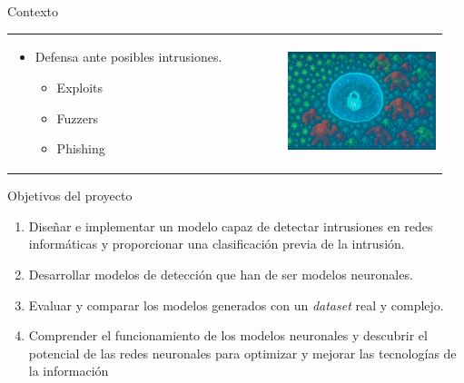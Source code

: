 \begin{frame}{Contexto}
\begin{tabular}{ >{\raggedright\arraybackslash}m{0.6\linewidth} >{\centering\arraybackslash}m{0.35\linewidth} }
    \begin{itemize}
      \item Defensa ante posibles intrusiones.
      \begin{itemize}
      	\item Exploits
      	\item Fuzzers
      	\item Phishing
      \end{itemize}
    \end{itemize} &
    \includegraphics[width=\linewidth]{./img/atacados.png} \\
  \end{tabular}
\end{frame}


\begin{frame}{Objetivos del proyecto}
    \begin{enumerate}
        \item  Diseñar e implementar un modelo capaz de detectar intrusiones en redes informáticas y proporcionar una clasificación previa de la intrusión.
        \vspace{10mm}
        \item Desarrollar modelos de detección que han de ser modelos neuronales.
        \vspace{10mm}
        \item Evaluar y comparar los modelos generados con un \textit{dataset} real y complejo.
        \vspace{10mm}
        \color{DoS}
        \item Comprender el funcionamiento de los modelos neuronales y descubrir el potencial de las redes neuronales para optimizar y mejorar las tecnologías de la información
    \end{enumerate}
\end{frame}

